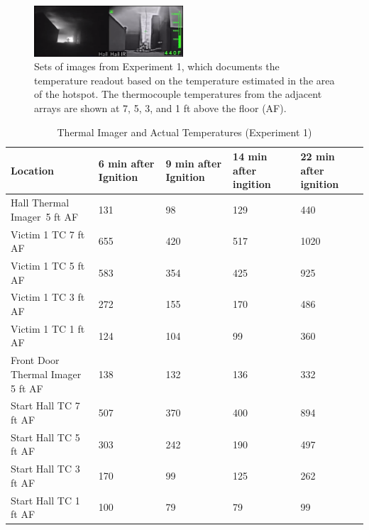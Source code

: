 \documentclass[12pt,oneside]{book}
\begin{document}
\begin{figure}[H]
\includegraphics[width=0.495\textwidth]{../0_Images/Tactical_Considerations/Thermal_Imager/Exp1Hall_22min.png}
\caption[Thermal Imager G]{Sets of images from Experiment 1, which documents the temperature readout based on the temperature estimated in the area of the hotspot. The thermocouple temperatures from the adjacent arrays are shown at 7, 5, 3, and 1 ft above the floor (AF).}
\label{fig:thermal_imager_g}
\end{figure}


\begin{table}[H]
\centering
\begin{tabular}{|L{0.25\textwidth}|C{0.15\textwidth}|C{0.15\textwidth}|C{0.15\textwidth}|C{0.15\textwidth}|}
\hline
Location	                    &6 min after Ignition	&9 min after Ignition	&14 min after ingition	&22 min after ignition \\ \hline \hline
Hall Thermal Imager~5 ft AF 	&131	&98	    &129	&440	\\ \hline
Victim 1 TC 7 ft AF				&655	&420	&517	&1020	\\ \hline
Victim 1 TC 5 ft AF				&583	&354	&425	&925	\\ \hline
Victim 1 TC 3 ft AF				&272	&155	&170	&486	\\ \hline
Victim 1 TC 1 ft AF				&124	&104	&99		&360 	\\ \hline
Front Door Thermal Imager 5 ft AF &138	&132	&136	&332	\\ \hline
Start Hall TC 7 ft AF			&507	&370	&400	&894	\\ \hline
Start Hall TC 5 ft AF			&303	&242	&190	&497	\\ \hline
Start Hall TC 3 ft AF			&170	&99		&125	&262	\\ \hline
Start Hall TC 1 ft AF			&100	&79		&79		&99		\\ \hline
\end{tabular}
\caption{Thermal Imager and Actual Temperatures (Experiment 1)}
\label{table:hall_thermal_imager_1}
\end{table}
\end{document}
